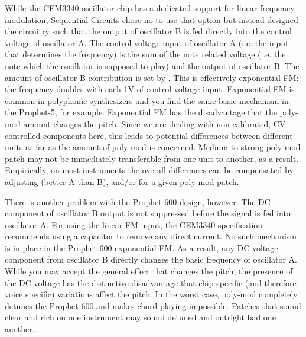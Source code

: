 \documentclass[landscape, 11pt, oneside, twoside]{report}
\newenvironment{flowtext}{\addmargin[0cm]{0cm}}{\endaddmargin} %
\begin{document}
\begin{flowtext}
While the CEM3340 oscillator chip has a dedicated support for linear frequency modulation, Sequential Circuits chose no to use that option but instead designed the circuitry such that the output of oscillator B is fed directly into the control voltage of oscillator A. The control voltage input of oscillator A (i.e. the input that determines the frequency) is the sum of the note related voltage (i.e. the note which the oscillator is supposed to play) and the output of oscillator B. The amount of oscillator B contribution is set by \polymodosc. This is effectively exponential FM: the frequency doubles with each 1V of control voltage input. Exponential FM is common in polyphonic synthesizers and you find the same basic mechanism in the Prophet-5, for example. Exponential FM has the disadvantage that the poly-mod amount changes the pitch. Since we are dealing with non-calibrated, CV controlled components here, this leads to potential differences between different units as far as the amount of poly-mod is concerned. Medium to strong poly-mod patch may not be immediately transferable from one unit to another, as a result. Empirically, on most instruments the overall differences can be compensated by adjusting \oscfreq (better A than B), \freqfine and/or \polymodosc for a given poly-mod patch.

There is another problem with the Prophet-600 design, however. The DC component of oscillator B output is not suppressed before the signal is fed into oscillator A. For using the linear FM input, the CEM3340 specification recommends using a capacitor to remove any direct current. No such mechanism is in place in the Prophet-600 exponential FM. As a result, any DC voltage component from oscillator B directly changes the basic frequency of oscillator A. While you may accept the general effect that \polymodosc changes the pitch, the presence of the DC voltage has the distinctive disadvantage that chip specific (and therefore voice specific) variations affect the pitch. In the worst case, poly-mod completely detunes the Prophet-600 and makes chord playing impossible. Patches that sound clear and rich on one instrument may sound detuned and outright bad one another. 


\end{flowtext}
\end{document}
